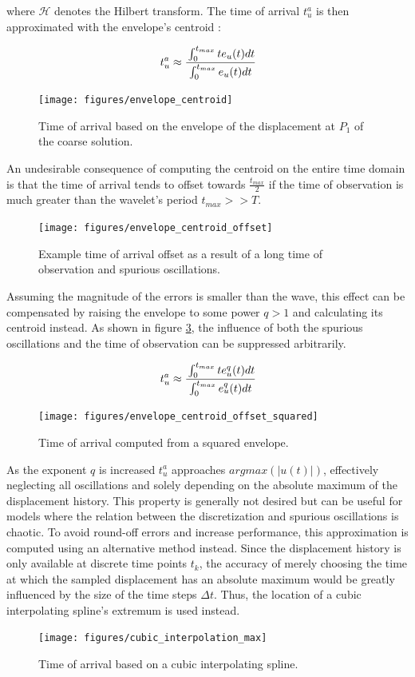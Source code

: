 where $\mathcal{H}$ denotes the Hilbert transform. The time of arrival $t^a_u$ is then approximated with the envelope's centroid \cite{Duczek2014_2}:

\begin{equation} \label{eq:time_of_arrival_envelope_centroid}
	t^a_u \approx \cfrac{ \int_0^{t_{max}} t e_u(t) dt }{ \int_0^{t_{max}} e_u(t) dt }
\end{equation}

\begin{figure}[h]
	\centering
	\texttt{[image: figures/envelope\_centroid]}
	\caption{Time of arrival based on the envelope of the displacement at $P_1$ of the coarse solution.}
	\label{fig:envelope_centroid}
\end{figure}

An undesirable consequence of computing the centroid on the entire time domain is that the time of arrival tends to offset towards $\frac{t_{max}}{2}$ if the time of observation is much greater than the wavelet's period $t_{max} >> T$.

\begin{figure}[h]
	\centering
	\texttt{[image: figures/envelope\_centroid\_offset]}
	\caption{Example time of arrival offset as a result of a long time of observation and spurious oscillations.}
	\label{fig:envelope_centroid_offset}
\end{figure}

Assuming the magnitude of the errors is smaller than the wave, this effect can be compensated by raising the envelope to some power $q>1$ and calculating its centroid instead. As shown in figure \ref{fig:envelope_centroid_offset_squared}, the influence of both the spurious oscillations and the time of observation can be suppressed arbitrarily.

\begin{equation} \label{eq:time_of_arrival_envelope_centroid_modified}
t^a_u \approx \cfrac{ \int_0^{t_{max}} t e_u^q(t) dt }{ \int_0^{t_{max}} e_u^q(t) dt }
\end{equation}

\begin{figure}[h]
	\centering
	\texttt{[image: figures/envelope\_centroid\_offset\_squared]}
	\caption{Time of arrival computed from a squared envelope.}
	\label{fig:envelope_centroid_offset_squared}
\end{figure}

As the exponent $q$ is increased $t^a_u$ approaches $argmax(|u(t)|)$, effectively neglecting all oscillations and solely depending on the absolute maximum of the displacement history. This property is generally not desired but can be useful for models where the relation between the discretization and spurious oscillations is chaotic. To avoid round-off errors and increase performance, this approximation is computed using an alternative method instead. Since the displacement history is only available at discrete time points $t_k$, the accuracy of merely choosing the time at which the sampled displacement has an absolute maximum would be greatly influenced by the size of the time steps $\Delta t$. Thus, the location of a cubic interpolating spline's extremum is used instead.

\begin{figure}[h]
	\centering
	\texttt{[image: figures/cubic\_interpolation\_max]}
	\caption{Time of arrival based on a cubic interpolating spline.}
	\label{fig:time_of_arrival_spline_peak}
\end{figure}
